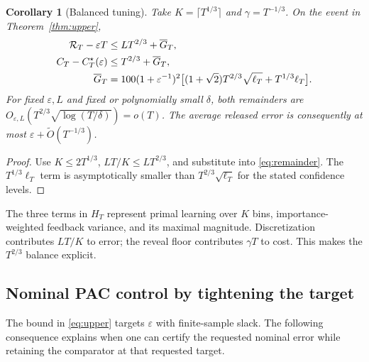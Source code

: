 \documentclass[11pt]{article}
\newtheorem{corollary}[theorem]{Corollary}
\theoremstyle{remark}
\newcommand{\calR}{\mathcal R}
\newcommand{\eps}{\varepsilon}
\begin{document}
\begin{corollary}[Balanced tuning]
\label{cor:balanced}
Take $K=\lceil T^{1/3}\rceil$ and $\gamma=T^{-1/3}$. On the event
in Theorem~\ref{thm:upper},
\begin{align}
 \calR_T-\eps T&\le LT^{2/3}+\overline G_T,\notag\\
 C_T-C_T^\star(\eps)&\le T^{2/3}+\overline G_T,\notag\\
 \overline G_T
 &=100(1+\eps^{-1})^2
 \bigl[(1+\sqrt2)T^{2/3}\sqrt{\ell_T}+T^{1/3}\ell_T\bigr].
 \label{eq:balanced}
\end{align}
For fixed $\eps,L$ and fixed or polynomially small $\delta$, both
remainders are $O_{\eps,L}(T^{2/3}\sqrt{\log(T/\delta)})=o(T)$.
The average released error is consequently at most
$\eps+\widetilde O(T^{-1/3})$.
\end{corollary}
\begin{proof}
Use $K\le2T^{1/3}$, $LT/K\le LT^{2/3}$, and substitute into
\eqref{eq:remainder}. The $T^{1/3}\ell_T$ term is asymptotically
smaller than $T^{2/3}\sqrt{\ell_T}$ for the stated confidence levels.
\end{proof}

The three terms in $H_T$ represent primal learning over $K$ bins,
importance-weighted feedback variance, and its maximal magnitude.
Discretization contributes $LT/K$ to error; the reveal floor contributes
$\gamma T$ to cost. This makes the $T^{2/3}$ balance explicit.

\subsection{Nominal PAC control by tightening the target}

The bound in \eqref{eq:upper} targets $\eps$ with finite-sample slack.
The following consequence explains when one can certify the requested
nominal error while retaining the comparator at that requested target.
\end{document}
